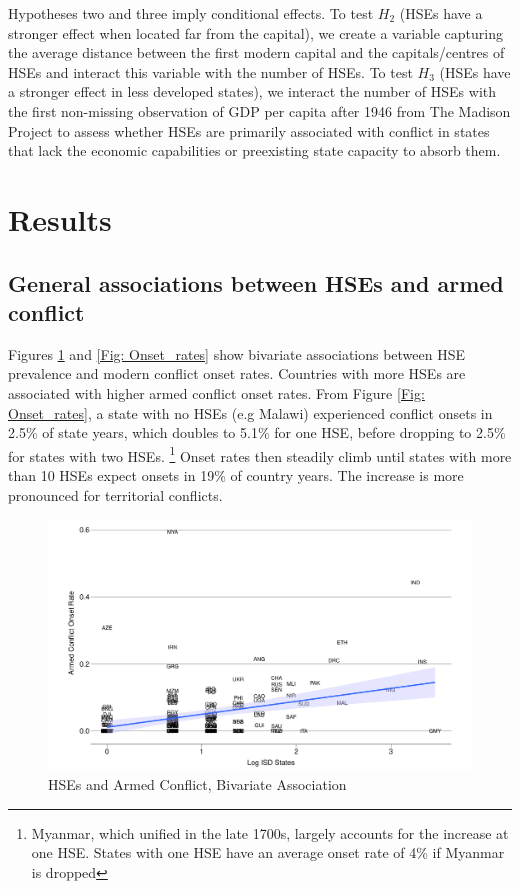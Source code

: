 Hypotheses two and three imply conditional effects. To test $H_2$ (HSEs have a
stronger effect when located far from the capital), we create a variable
capturing the average distance between the first modern capital and the
capitals/centres of HSEs and interact this variable with the number of HSEs. To
test $H_3$ (HSEs have a stronger effect in less developed states), we interact
the number of HSEs with the first non-missing observation of GDP per capita
after 1946 from The Madison Project to assess whether HSEs are primarily
associated with conflict in states that lack the economic capabilities or
preexisting state capacity to absorb them.   

\section{Results}

\subsection{General associations between HSEs and armed conflict}

Figures \ref{Fig: Main_Scatter} and \ref{Fig: Onset_rates} show bivariate
associations between HSE prevalence and modern conflict onset rates. Countries
with more HSEs are associated with higher armed conflict onset rates. From
Figure \ref{Fig: Onset_rates}, a state with no HSEs (e.g Malawi) experienced
conflict onsets in 2.5\% of state years, which doubles to 5.1\% for one HSE,
before dropping to 2.5\% for states with two HSEs. \footnote{Myanmar, which
unified in the late 1700s, largely accounts for the increase at one HSE. States
with one HSE have an average onset rate of 4\% if Myanmar is dropped} Onset
rates then steadily climb until states with more than 10 HSEs expect onsets in
19\% of country years. The increase is more pronounced for territorial
conflicts.

\begin{figure}[!htb]
	\includegraphics[width=\textwidth]{img/hse_scatterplot.pdf}
	\caption{HSEs and Armed Conflict, Bivariate Association} 
	\label{Fig: Main_Scatter}
\end{figure}


